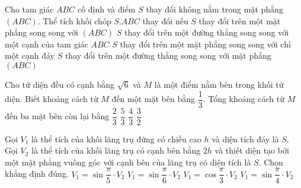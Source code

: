 \begin{ex}%
	Cho tam giác $ ABC $ cố định và điểm $ S $ thay đổi không nằm trong mặt phẳng $ (ABC) $. Thể tích khối chóp $ S.ABC $ thay đổi nếu
	\choice
	{ $ S $ thay đổi trên một mặt phẳng song song với $ (ABC) $}
	{ $ S $ thay đổi trên một đường thẳng song song với một cạnh của tam giác $ ABC $}
	{\True  $ S $ thay đổi trên một mặt phẳng song song với chỉ một cạnh đáy}
	{ $ S $ thay đổi trên một đường thẳng song song với mặt phẳng $ (ABC) $}
\end{ex}	
\begin{ex}%
	Cho tứ diện đều  có cạnh bằng $ \sqrt{6} $ và $ M $ là một điểm nằm bên trong khối tứ diện.	Biết khoảng cách từ $ M $ đến một mặt bên bằng $ \dfrac{1}{3} $. Tổng khoảng cách từ $ M $ đến ba mặt bên còn lại  bằng
	\choice
	{$ \dfrac{2}{3} $}
	{\True $ \dfrac{5}{3} $}
	{$ \dfrac{4}{3} $}
	{$ \dfrac{3}{2} $}
\end{ex}	
\begin{ex}%
	Gọi $ V_1 $ là thể tích của khối lăng trụ đứng có chiều cao $ h $ và diện tích đáy là $ S $. Gọi $ V_2 $ là thể tích của khối lăng trụ có cạnh bên bằng $ 2h $ và thiết diện tạo bởi  một mặt phẳng vuông góc với cạnh bên của lăng trụ có diện tích là $ S $. Chọn khẳng định đúng.
	\choice
	{$ V_1 = \sin \dfrac{\pi}{5} \cdot  V_2 $}
	{$ V_1 = \sin \dfrac{\pi}{6} \cdot V_2 $}
	{\True $ V_1 = \cos \dfrac{\pi}{3} \cdot V_2 $}
	{$ V_1 = \sin \dfrac{\pi}{4} \cdot V_2 $}
\end{ex}	
